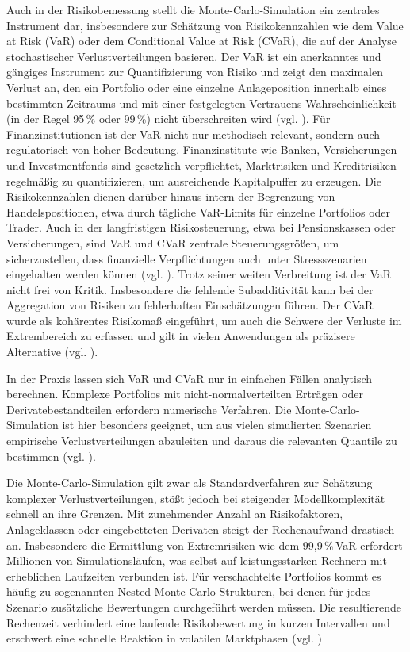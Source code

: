 Auch in der Risikobemessung stellt die Monte-Carlo-Simulation ein zentrales Instrument dar, insbesondere zur Schätzung von Risikokennzahlen wie dem Value at Risk (VaR) oder dem Conditional Value at Risk (CVaR), die auf der Analyse stochastischer Verlustverteilungen basieren. Der VaR ist ein anerkanntes und gängiges Instrument zur Quantifizierung von Risiko und zeigt den maximalen Verlust an, den ein Portfolio oder eine einzelne Anlageposition innerhalb eines bestimmten Zeitraums und mit einer festgelegten Vertrauens-Wahrscheinlichkeit (in der Regel 95\,\% oder 99\,\%) nicht überschreiten wird (vgl. \cite{springer2025, plos2024}). 
Für Finanzinstitutionen ist der VaR nicht nur methodisch relevant, sondern auch regulatorisch von hoher Bedeutung. Finanzinstitute wie Banken, Versicherungen und Investmentfonds sind gesetzlich verpflichtet, Marktrisiken und Kreditrisiken regelmäßig zu quantifizieren, um ausreichende Kapitalpuffer zu erzeugen. Die Risikokennzahlen dienen darüber hinaus intern der Begrenzung von Handelspositionen, etwa durch tägliche VaR-Limits für einzelne Portfolios oder Trader. Auch in der langfristigen Risikosteuerung, etwa bei Pensionskassen oder Versicherungen, sind VaR und CVaR zentrale Steuerungsgrößen, um sicherzustellen, dass finanzielle Verpflichtungen auch unter Stressszenarien eingehalten werden können (vgl. \cite{orus_quantum_2019}).
Trotz seiner weiten Verbreitung ist der VaR nicht frei von Kritik. Insbesondere die fehlende Subadditivität kann bei der Aggregation von Risiken zu fehlerhaften Einschätzungen führen. Der CVaR wurde als kohärentes Risikomaß eingeführt, um auch die Schwere der Verluste im Extrembereich zu erfassen und gilt in vielen Anwendungen als präzisere Alternative (vgl. \cite{orus_quantum_2019}). 

In der Praxis lassen sich VaR und CVaR nur in einfachen Fällen analytisch berechnen. Komplexe Portfolios mit nicht-normalverteilten Erträgen oder Derivatebestandteilen erfordern numerische Verfahren. Die Monte-Carlo-Simulation ist hier besonders geeignet, um aus vielen simulierten Szenarien empirische Verlustverteilungen abzuleiten und daraus die relevanten Quantile zu bestimmen (vgl. \cite{zoufal_quantum_2019}).

Die Monte-Carlo-Simulation gilt zwar als Standardverfahren zur Schätzung komplexer Verlustverteilungen, stößt jedoch bei steigender Modellkomplexität schnell an ihre Grenzen. Mit zunehmender Anzahl an Risikofaktoren, Anlageklassen oder eingebetteten Derivaten steigt der Rechenaufwand drastisch an. Insbesondere die Ermittlung von Extremrisiken wie dem 99{,}9\,\%\,VaR erfordert Millionen von Simulationsläufen, was selbst auf leistungsstarken Rechnern mit erheblichen Laufzeiten verbunden ist. Für verschachtelte Portfolios kommt es häufig zu sogenannten Nested-Monte-Carlo-Strukturen, bei denen für jedes Szenario zusätzliche Bewertungen durchgeführt werden müssen. Die resultierende Rechenzeit verhindert eine laufende Risikobewertung in kurzen Intervallen und erschwert eine schnelle Reaktion in volatilen Marktphasen (vgl. \cite{bouland_prospects_2020, orus_quantum_2019})


